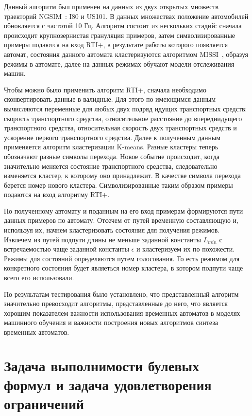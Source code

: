 \documentclass[times,specification,annotation]{itmo-student-thesis}
\begin{document}
Данный алгоритм был применен на данных из двух открытых множеств траекторий NGSIM~\cite{ngsim}: I80 и US101. В данных множествах положение автомобилей обновляется с частотой 10 Гц.
Алгоритм состоит из нескольких стадий: сначала происходит крупнозернистая грануляция примеров, затем символизированные примеры подаются на вход RTI+, в результате работы которого
появляется автомат, состояния данного автомата кластеризуются алгоритмом MISSI~\cite{moha}, образуя режимы в автомате, далее на данных режимах обучают модели отслеживания
машин.

Чтобы можно было применить алгоритм RTI+, сначала необходимо сконвертировать данные в валидные. Для этого по имеющимся данным вычисляются переменные для любых
двух подряд идущих транспортных средств: скорость транспортного средства, относительное расстояние до впередиидущего транспортного средства, относительная скорость двух транспортных
средств и ускорение первого транспортного средства. Далее к полученным данным применяется алгоритм кластеризации K-means. Разные кластеры теперь обозначают разные символы перехода.
Новое событие происходит, когда значительно меняется состояние транспортного средства, следовательно изменяется кластер, к которому оно принадлежит. В качестве символа перехода берется номер
нового кластера. Символизированные таким образом примеры подаются на вход алгоритму RTI+.

По полученному автомату и поданным на его вход примерам формируются пути данных примеров по автомату. Отсечем от путей временную составляющую и, используя их, начнем кластеризовать состояния
для получения режимов. Извлечем из путей подпути длины не меньше заданной константы $L_{min}$ с встречаемостью чаще заданной константы $\epsilon$ и кластеризуем их по похожести. Режимы для
состояний определяются путем голосования. То есть режимом для конкретного состояния будет являеться номер кластера, в котором подпути чаще всего его использовали.

По результатам тестирования было установлено, что представленный алгоритм значительно превосходит алгоритмы, представленные до него, что является хорошим показателем важности
использования временных автоматов в моделях машинного обучения и важности построения новых алгоритмов синтеза временных автоматов.

\section{Задача выполнимости булевых формул и задача удовлетворения ограничений}
\end{document}
